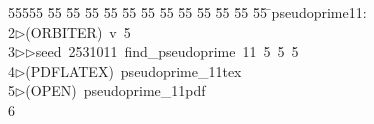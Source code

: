 %
%
\begin{tabbing}
55555 \= 55 \= 55 \= 55 \= 55 \= 55 \= 55 \= 55 \= 55 \= 55 \= 55 \= 55 \= 55 \= \>pseudoprime11:\\[0pt]
2\>$\triangleright$\>(ORBITER)\ v\ 5\ \\[0pt]
3\>$\triangleright$\>$\triangleright$\>seed\ 2531011\ find\_pseudoprime\ 11\ 5\ 5\ 5\ \\[0pt]
4\>$\triangleright$\>(PDFLATEX)\ pseudoprime\_11tex\\[0pt]
5\>$\triangleright$\>(OPEN)\ pseudoprime\_11pdf\\[0pt]
6\>\end{tabbing}
